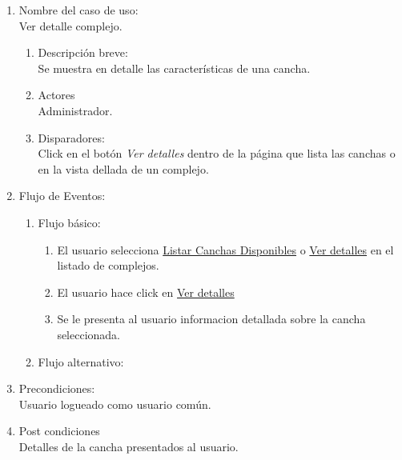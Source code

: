 \documentclass[a4paper,11pt]{article}
\begin{document}
\begin{enumerate}

    \item Nombre del caso de uso: \\
        Ver detalle complejo.

    \begin{enumerate}
    \item Descripción breve: \\
        Se muestra en detalle las características de una cancha.
    \item Actores \\
        Administrador.
    \item Disparadores: \\
        Click en el botón \emph{Ver detalles} dentro de la
        página que lista las canchas o en la vista dellada de un complejo.
    \end{enumerate}

    \item Flujo de Eventos: \\

    \begin{enumerate}

        \item Flujo básico:\\
        \begin{enumerate}
            \item El usuario selecciona \underline{Listar Canchas Disponibles}
                o \underline{Ver detalles} en el listado de complejos.
            \item El usuario hace click en \underline{Ver detalles}
            \item Se le presenta al usuario informacion detallada sobre la cancha seleccionada.
        \end{enumerate}
    \item Flujo alternativo:\\
    \end{enumerate}

    \item Precondiciones: \\
        Usuario logueado como usuario común.

    \item Post condiciones \\
        Detalles de la cancha presentados al usuario.

\end{enumerate}
\end{document}
